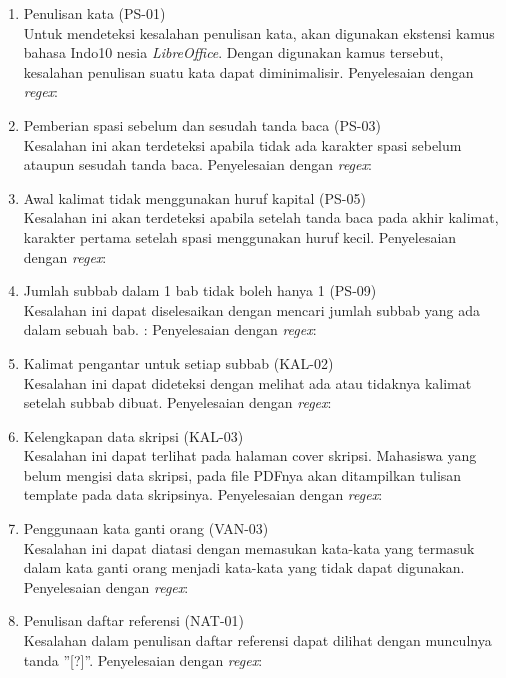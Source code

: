 \begin{enumerate}
	\item Penulisan kata (PS-01) \\
	Untuk mendeteksi kesalahan penulisan kata, akan digunakan ekstensi kamus bahasa Indo10
nesia \textit{LibreOffice}. Dengan digunakan kamus tersebut, kesalahan penulisan suatu kata dapat diminimalisir. \newline
	Penyelesaian dengan \textit{regex}:
	
	\item Pemberian spasi sebelum dan sesudah tanda baca (PS-03) \\
	Kesalahan ini akan terdeteksi apabila tidak ada karakter spasi sebelum ataupun sesudah tanda baca.
	Penyelesaian dengan \textit{regex}:
	
	\item Awal kalimat tidak menggunakan huruf kapital (PS-05) \\
	Kesalahan ini akan terdeteksi apabila setelah tanda baca pada akhir kalimat, karakter pertama setelah spasi menggunakan huruf kecil.	
	Penyelesaian dengan \textit{regex}:
	
	\item Jumlah subbab dalam 1 bab tidak boleh hanya 1 (PS-09) \\
	Kesalahan ini dapat diselesaikan dengan mencari jumlah subbab yang ada dalam sebuah bab. \newline:
	Penyelesaian dengan \textit{regex}:
	
	\item Kalimat pengantar untuk setiap subbab (KAL-02) \\
	Kesalahan ini dapat dideteksi dengan melihat ada atau tidaknya kalimat setelah subbab dibuat. \newline
	Penyelesaian dengan \textit{regex}:
	
	\item Kelengkapan data skripsi (KAL-03) \\
	Kesalahan ini dapat terlihat pada halaman cover skripsi. Mahasiswa yang belum mengisi data skripsi, pada file PDFnya akan ditampilkan tulisan template pada data skripsinya. \newline
	Penyelesaian dengan \textit{regex}:
	
	\item Penggunaan kata ganti orang (VAN-03) \\
	Kesalahan ini dapat diatasi dengan memasukan kata-kata yang termasuk dalam kata ganti orang menjadi kata-kata yang tidak dapat digunakan. \newline
	Penyelesaian dengan \textit{regex}:
	
	\item Penulisan daftar referensi (NAT-01) \\
	Kesalahan dalam penulisan daftar referensi dapat dilihat dengan munculnya tanda ''[?]''. \newline
	Penyelesaian dengan \textit{regex}:
	
\end{enumerate}